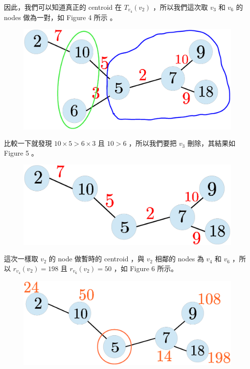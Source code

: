 \documentclass[12pt]{article}
\begin{document}
\begin{CJK}{UTF8}{bkai}
因此，我們可以知道真正的 centroid 在 $T_{v_4}(v_2)$ ，所以我們這次取 $v_3$ 和 $v_6$ 的 nodes 做為一對，如
Figure 4 所示 。

\begin{figure}[H]
\centering
\includegraphics[scale=0.3]{fig4.eps}
\caption{}
\end{figure}

比較一下就發現 $10 \times 5 > 6 \times 3$ 且 $10 > 6$ ，所以我們要把 $v_3$ 刪除，其結果如 Figure 5 。

\begin{figure}[H]
\centering
\includegraphics[scale=0.3]{fig5.eps}
\caption{}
\end{figure}

這次一樣取 $v_2$ 的 node 做暫時的 centroid ，與 $v_2$ 相鄰的 nodes 為 $v_4$ 和 $v_6$ ，所以 $r_{v_4}(v_2)=198$
且 $r_{v_6}(v_2)=50$ ，如 Figure 6 所示。

\begin{figure}[H]
\centering
\includegraphics[scale=0.3]{fig6.eps}
\caption{}
\end{figure}


\end{CJK}
\end{document}
